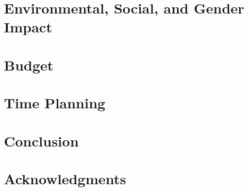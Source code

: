\documentclass[a4paper, 11pt, titlepage, twoside]{article}
\begin{document}
\section{Environmental, Social, and Gender Impact}

\newpage

\section{}

\newpage

\cleardoublepage
\section{Budget}


\cleardoublepage
\section{Time Planning}


\section{Conclusion}\label{Conclusion}

\newpage

\section*{Acknowledgments}\label{acknow} 


\appendix
\cleardoublepage

\cleardoublepage
\printbibliography
\end{document}
